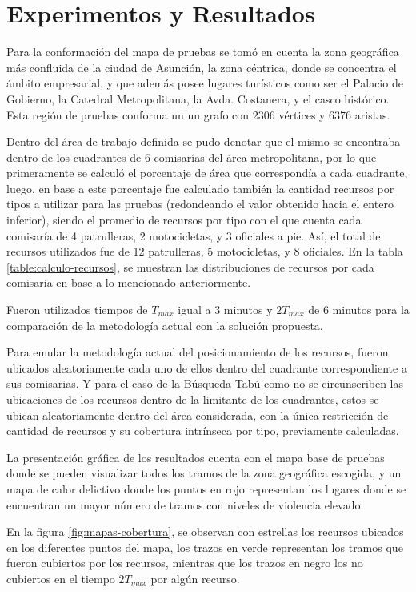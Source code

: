 \section{Experimentos y Resultados}
Para la conformación del mapa de pruebas se tomó en cuenta la zona geográfica más confluida de la ciudad de Asunción, la zona céntrica, donde se concentra el ámbito empresarial, y que además posee lugares turísticos como ser el Palacio de Gobierno, la Catedral Metropolitana, la Avda. Costanera, y el casco histórico. Esta región de pruebas conforma un un grafo con 2306 vértices y 6376 aristas.

Dentro del área de trabajo definida se pudo denotar que el mismo se encontraba dentro de los cuadrantes de 6 comisarías del área metropolitana, por lo que primeramente se calculó el porcentaje de área que correspondía a cada cuadrante, luego, en base a este porcentaje fue calculado también la cantidad recursos por tipos a utilizar para las pruebas (redondeando el valor obtenido hacia el entero inferior), siendo el promedio de recursos por tipo con el que cuenta cada comisaría de 4 patrulleras, 2 motocicletas, y 3 oficiales a pie. Así, el total de recursos utilizados fue de 12 patrulleras, 5 motocicletas, y 8 oficiales. En la tabla \ref{table:calculo-recursos}, se muestran las distribuciones de recursos por cada comisaria en base a lo mencionado anteriormente.

Fueron utilizados tiempos de $T_{max}$ igual a 3 minutos y $2T_{max}$ de 6 minutos para la comparación de la metodología actual con la solución propuesta.

Para emular la metodología actual del posicionamiento de los recursos, fueron ubicados aleatoriamente cada uno de ellos dentro del cuadrante correspondiente a sus comisarias. Y para el caso de la Búsqueda Tabú como no se circunscriben las ubicaciones de los recursos dentro de la limitante de los cuadrantes, estos se ubican aleatoriamente dentro del área considerada, con la única restricción de cantidad de recursos y su cobertura intrínseca por tipo, previamente calculadas.

La presentación gráfica de los resultados cuenta con el mapa base de pruebas donde se pueden visualizar todos los tramos de la zona geográfica escogida, y un mapa de calor delictivo donde los puntos en rojo representan los lugares donde se encuentran un mayor número de tramos con niveles de violencia elevado.

En la figura \ref{fig:mapas-cobertura}, se observan con estrellas los recursos ubicados en los diferentes puntos del mapa, los trazos en verde representan los tramos que fueron cubiertos por los recursos, mientras que los trazos en negro los no cubiertos en el tiempo $2T_{max}$ por algún recurso.

